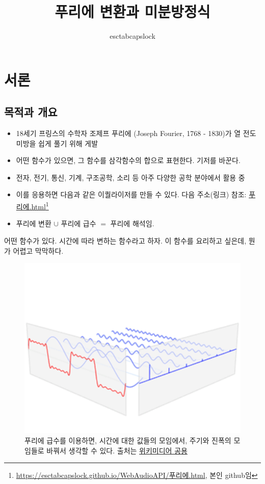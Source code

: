 \documentclass[article, oneside]{oblivoir}
\title{푸리에 변환과 미분방정식}
\author{esctabcapslock}
\begin{document}
\maketitle

\section{서론}
\subsection{목적과 개요}

\begin{itemize}
    \item 18세기 프링스의 수학자 조제프 푸리에 (Joseph Fourier, 1768 - 1830)가 열 전도 미방을 쉽게 풀기 위해 게발
    \item 어떤 함수가 있으면, 그 함수를 삼각함수의 합으로 표현한다. 기저를 바꾼다.
    \item 전자, 전기, 통신, 기계, 구조공학, 소리 등 아주 다양한 공학 분야에서 활용 중
    \item 이를 응용하면 다음과 같은 이퀄라이저를 만들 수 있다. 다음 주소(링크) 참조: \href{https://esctabcapslock.github.io/WebAudioAPI/푸리에.html}{푸리에.html}\footnote{\href{https://esctabcapslock.github.io/WebAudioAPI/푸리에.html}{https://esctabcapslock.github.io/WebAudioAPI/푸리에.html}, 본인 github임}
    \item 푸리에 변환 $\cup$ 푸리에 급수 $=$ 푸리에 해석임.
\end{itemize}
어떤 함수가 있다. 시간에 따라 변하는 함수라고 하자. 이 함수를 요리하고 싶은데, 뭔가 어렵고 막막하다.

\begin{figure}[ht]
    \centering
    \includegraphics[width=.4\textwidth]{./img/3.png}
    \caption{푸리에 급수를 이용하면, 시간에 대한 값들의 모임에서, 주기와 진폭의 모임들로 바꿔서 생각할 수 있다. 출처는 \href{https://en.wikipedia.org/wiki/File:Fourier_transform_time_and_frequency_domains_(small).gif}{위키미디어 공용}}
    \label{fig:my_label}
\end{figure}
\end{document}

